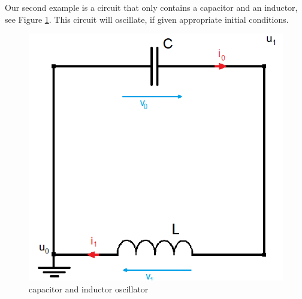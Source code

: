 \begin{example2}[LC-Circuit]
	\label{ex:LC-circuit incidence matrix}
	Our second example is a circuit that only contains a capacitor and an inductor, see Figure \ref{circuit:LC-circuit}. This circuit will oscillate, if given appropriate initial conditions.
	\begin{figure}[H]
		\centering
		\includegraphics[scale=0.5]{pictures/Example2_index0.png}
		\caption{capacitor and inductor oscillator}
		\label{circuit:LC-circuit}
	\end{figure}
	

\end{example2}
